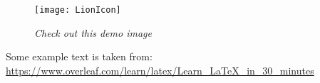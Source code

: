 \documentclass[12pt]{article}
\begin{document}
  \begin{figure}[h]
    \centering
    \texttt{[image: LionIcon]}
    \caption{\textit{Check out this demo image}}
  \end{figure}
  
  \vfill %
  
  \noindent
  {\footnotesize  
  \begin{minipage}[b]{1\textwidth}
    Some example text is taken from: \url{https://www.overleaf.com/learn/latex/Learn_LaTeX_in_30_minutes}
  \end{minipage}
  } 
  \vspace{-3mm} %
\end{document}
